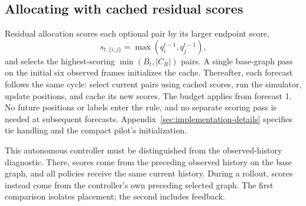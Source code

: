 \subsection{Allocating with cached residual scores}
Residual allocation scores each optional pair by its larger endpoint score,
\begin{equation}
 s_{t,\{i,j\}}=\max(q_i^{t-1},q_j^{t-1}),
\end{equation}
and selects the highest-scoring $\min(B_t,|C_R|)$ pairs. A single base-graph pass on the initial six observed frames initializes the cache. Thereafter, each forecast follows the same cycle: select current pairs using cached scores, run the simulator, update positions, and cache its new scores. The budget applies from forecast 1. No future positions or labels enter the rule, and no separate scoring pass is needed at subsequent forecasts. Appendix~\ref{sec:implementation-details} specifies tie handling and the compact pilot's initialization.

This autonomous controller must be distinguished from the observed-history diagnostic. There, scores come from the preceding observed history on the base graph, and all policies receive the same current history. During a rollout, scores instead come from the controller's own preceding selected graph. The first comparison isolates placement; the second includes feedback.

